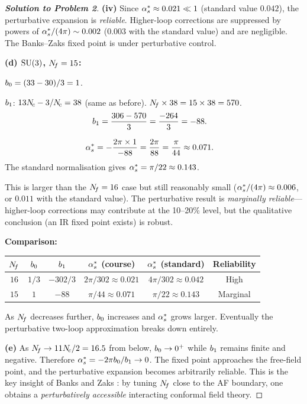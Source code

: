 \documentclass[11pt,a4paper]{article}
\begin{document}
\begin{proof}[\textbf{Solution to Problem 2}]
\textbf{(iv)} Since $\alpha_s^* \approx 0.021 \ll 1$ (standard value
$0.042$), the perturbative expansion is \emph{reliable}.  Higher-loop
corrections are suppressed by powers of $\alpha_s^*/(4\pi) \sim 0.002$
($0.003$ with the standard value) and are negligible.  The
Banks--Zaks fixed point is under perturbative control.

\bigskip

\textbf{(d) $\mathrm{SU}(3)$, $N_{\!f} = 15$:}

$b_0 = (33 - 30)/3 = 1$.

$b_1$: $13N_{\!c} - 3/N_{\!c} = 38$ (same as before). $N_{\!f} \times 38 = 15 \times 38 = 570$.
\begin{align}
  b_1 &= \frac{306 - 570}{3} = \frac{-264}{3} = -88.
\end{align}

\begin{align}
  \alpha_s^* &= -\frac{2\pi \times 1}{-88}
  = \frac{2\pi}{88}
  = \frac{\pi}{44}
  \approx 0.071.
\end{align}
The standard normalisation gives $\alpha_s^* = \pi/22 \approx 0.143$.

This is larger than the $N_{\!f} = 16$ case but still reasonably small
($\alpha_s^*/(4\pi) \approx 0.006$, or $0.011$ with the standard
value).  The perturbative result is
\emph{marginally reliable}---higher-loop corrections may contribute at the
10--20\% level, but the qualitative conclusion (an IR fixed point exists)
is robust.

\textbf{Comparison:}

\begin{center}
\renewcommand{\arraystretch}{1.3}
\begin{tabular}{@{}c c c c c c@{}}
\toprule
$N_{\!f}$ & $b_0$ & $b_1$ & $\alpha_s^*$ (course) & $\alpha_s^*$ (standard)
  & Reliability \\
\midrule
$16$ & $1/3$ & $-302/3$ & $2\pi/302 \approx 0.021$ & $4\pi/302 \approx 0.042$
  & High \\
$15$ & $1$ & $-88$ & $\pi/44 \approx 0.071$ & $\pi/22 \approx 0.143$
  & Marginal \\
\bottomrule
\end{tabular}
\end{center}

As $N_{\!f}$ decreases further, $b_0$ increases and $\alpha_s^*$ grows
larger.  Eventually the perturbative two-loop approximation breaks down
entirely.

\textbf{(e)} As $N_{\!f} \to 11N_{\!c}/2 = 16.5$ from below, $b_0 \to 0^+$ while
$b_1$ remains finite and negative.  Therefore
$\alpha_s^* = -2\pi b_0/b_1 \to 0$.  The fixed point approaches the
free-field point, and the perturbative expansion becomes arbitrarily
reliable.  This is the key insight of Banks and Zaks \cite{BanksZaks1982}:
by tuning $N_{\!f}$ close to the AF boundary, one obtains a \emph{perturbatively
accessible} interacting conformal field theory.
\end{proof}
\end{document}
